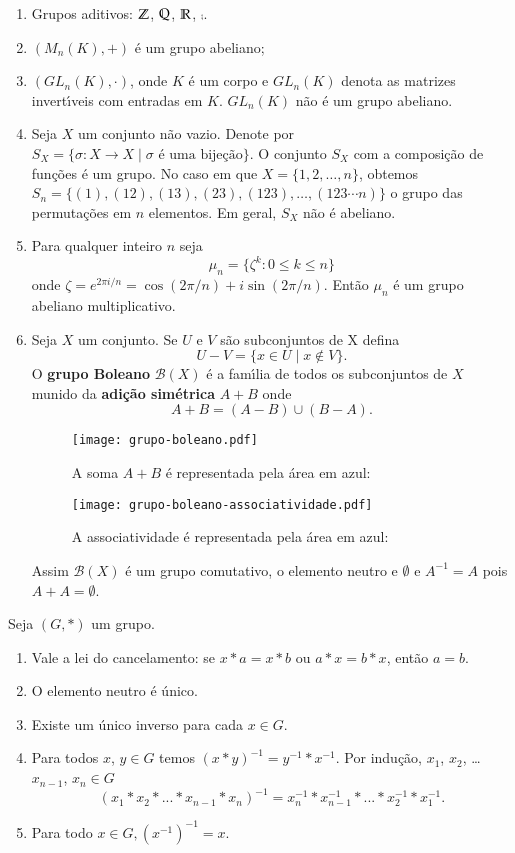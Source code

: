 \begin{exemplos}
	\begin{enumerate}[label=({\arabic*})]
		\item Grupos aditivos: $\mathbb{Z}$, $\mathbb{Q}$, $\mathbb{R}$, $\comp$.
		\item $(M_n(K), +)$ \'e um grupo abeliano;
		\item $(GL_n(K), \cdot)$, onde $K$ \'e um corpo e $GL_n(K)$ denota as matrizes invert{\'\i}veis com entradas em $K$. $GL_n(K)$ n\~ao \'e um grupo abeliano.
		\item Seja $X$ um conjunto n\~ao vazio. Denote por $S_X = \{\sigma : X \to X \mid \sigma \mbox{ \'e uma bije\c{c}\~ao}\}$. O conjunto $S_X$ com a composi\c{c}\~ao de fun\c{c}\~oes \'e um grupo. No caso em que $X = \{1, 2, \dots, n\}$, obtemos $S_n = \{(1), (12), (13), (23), (123), \dots, (123\cdots n)\}$ o grupo das permuta\c{c}\~oes em $n$ elementos. Em geral, $S_X$ n\~ao \'e abeliano.
		\item Para qualquer inteiro $n$ seja
		\[
			\mu_n = \{\zeta^k : 0 \le k \le n\}
		\]
		onde $\zeta = e^{2\pi i/n} = \cos(2\pi/n) + i\sin(2\pi/n)$. Ent\~ao $\mu_n$ \'e um grupo abeliano multiplicativo.
		\item Seja $X$ um conjunto. Se $U$ e $V$ s\~ao subconjuntos de X defina
		\[
			U - V = \{x \in U \mid x \notin V\}.
		\]
		O \textbf{grupo Boleano} $\mathcal{B}(X)$ \'e a fam{\'\i}lia de todos os subconjuntos de $X$ munido da \textbf{adi\c{c}\~ao sim\'etrica} $A + B$ onde
		\[
			A + B = (A - B) \cup (B - A).
		\]
		\begin{figure}[h]
			\centering
			\caption{A soma $A + B$ \'e representada pela \'area em azul:}
			\texttt{[image: grupo-boleano.pdf]}
		\end{figure}

		\begin{figure}[h]
			\centering
			\caption{A associatividade \'e representada pela \'area em azul:}
			\texttt{[image: grupo-boleano-associatividade.pdf]}
		\end{figure}
		Assim $\mathcal{B}(X)$ \'e um grupo comutativo, o elemento neutro e $\emptyset$ e $A^{-1} = A$ pois $A + A = \emptyset$.
	\end{enumerate}
\end{exemplos}

\begin{lema}
Seja $(G,*)$ um grupo.
\begin{enumerate}[label=({\roman*})]
\item Vale a lei do cancelamento: se $x * a = x * b$ ou $a * x = b * x$, ent\~ao $a = b$.
\item O elemento neutro {\'e} {\'u}nico.
\item Existe um {\'u}nico inverso para cada $x\in G$.
\item Para todos $x$, $y\in G$ temos $(x*y)^{-1}=y^{-1}*x^{-1}$. Por indu{\c c}{\~a}o, $x_{1}$, $x_{2}$, \dots $x_{n-1}$, $x_{n}\in G$
	\[
		(x_1*x_2*...*x_{n-1}*x_n)^{-1} = x^{-1}_n*x^{-1}_{n-1}*...*x^{-1}_2*x^{-1}_1.
	\]
\item Para todo $x\in G, (x^{-1})^{-1}=x$.
\end{enumerate}
\end{lema}

